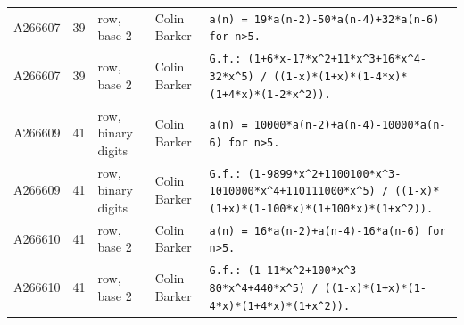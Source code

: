 \documentclass[11pt]{article}
\theoremstyle{definition}
\theoremstyle{remark}
\begin{document}
{\begin{longtable}{p{1.3cm}p{0.7cm}p{2.4cm}p{2.3cm}p{7.3cm}}
A266607 & 39 & row, base 2 & Colin Barker & \texttt{a(n)\allowbreak{} \allowbreak{}=\allowbreak{} \allowbreak{}19*\allowbreak{}a(n-\allowbreak{}2)\allowbreak{}-\allowbreak{}50*\allowbreak{}a(n-\allowbreak{}4)\allowbreak{}+\allowbreak{}32*\allowbreak{}a(n-\allowbreak{}6)\allowbreak{} \allowbreak{}for \allowbreak{}n>5.} \\
A266607 & 39 & row, base 2 & Colin Barker & \texttt{G.f.: \allowbreak{}(1+\allowbreak{}6*\allowbreak{}x-\allowbreak{}17*\allowbreak{}x\^{}2+\allowbreak{}11*\allowbreak{}x\^{}3+\allowbreak{}16*\allowbreak{}x\^{}4-\allowbreak{}32*\allowbreak{}x\^{}5)\allowbreak{} \allowbreak{}/\allowbreak{} \allowbreak{}((1-\allowbreak{}x)\allowbreak{}*\allowbreak{}(1+\allowbreak{}x)\allowbreak{}*\allowbreak{}(1-\allowbreak{}4*\allowbreak{}x)\allowbreak{}*\allowbreak{}(1+\allowbreak{}4*\allowbreak{}x)\allowbreak{}*\allowbreak{}(1-\allowbreak{}2*\allowbreak{}x\^{}2)\allowbreak{})\allowbreak{}.} \\
A266609 & 41 & row, binary digits & Colin Barker & \texttt{a(n)\allowbreak{} \allowbreak{}=\allowbreak{} \allowbreak{}10000*\allowbreak{}a(n-\allowbreak{}2)\allowbreak{}+\allowbreak{}a(n-\allowbreak{}4)\allowbreak{}-\allowbreak{}10000*\allowbreak{}a(n-\allowbreak{}6)\allowbreak{} \allowbreak{}for \allowbreak{}n>5.} \\
A266609 & 41 & row, binary digits & Colin Barker & \texttt{G.f.: \allowbreak{}(1-\allowbreak{}9899*\allowbreak{}x\^{}2+\allowbreak{}1100100*\allowbreak{}x\^{}3-\allowbreak{}1010000*\allowbreak{}x\^{}4+\allowbreak{}110111000*\allowbreak{}x\^{}5)\allowbreak{} \allowbreak{}/\allowbreak{} \allowbreak{}((1-\allowbreak{}x)\allowbreak{}*\allowbreak{}(1+\allowbreak{}x)\allowbreak{}*\allowbreak{}(1-\allowbreak{}100*\allowbreak{}x)\allowbreak{}*\allowbreak{}(1+\allowbreak{}100*\allowbreak{}x)\allowbreak{}*\allowbreak{}(1+\allowbreak{}x\^{}2)\allowbreak{})\allowbreak{}.} \\
A266610 & 41 & row, base 2 & Colin Barker & \texttt{a(n)\allowbreak{} \allowbreak{}=\allowbreak{} \allowbreak{}16*\allowbreak{}a(n-\allowbreak{}2)\allowbreak{}+\allowbreak{}a(n-\allowbreak{}4)\allowbreak{}-\allowbreak{}16*\allowbreak{}a(n-\allowbreak{}6)\allowbreak{} \allowbreak{}for \allowbreak{}n>5.} \\
A266610 & 41 & row, base 2 & Colin Barker & \texttt{G.f.: \allowbreak{}(1-\allowbreak{}11*\allowbreak{}x\^{}2+\allowbreak{}100*\allowbreak{}x\^{}3-\allowbreak{}80*\allowbreak{}x\^{}4+\allowbreak{}440*\allowbreak{}x\^{}5)\allowbreak{} \allowbreak{}/\allowbreak{} \allowbreak{}((1-\allowbreak{}x)\allowbreak{}*\allowbreak{}(1+\allowbreak{}x)\allowbreak{}*\allowbreak{}(1-\allowbreak{}4*\allowbreak{}x)\allowbreak{}*\allowbreak{}(1+\allowbreak{}4*\allowbreak{}x)\allowbreak{}*\allowbreak{}(1+\allowbreak{}x\^{}2)\allowbreak{})\allowbreak{}.} \\

\end{longtable}}
\end{document}
